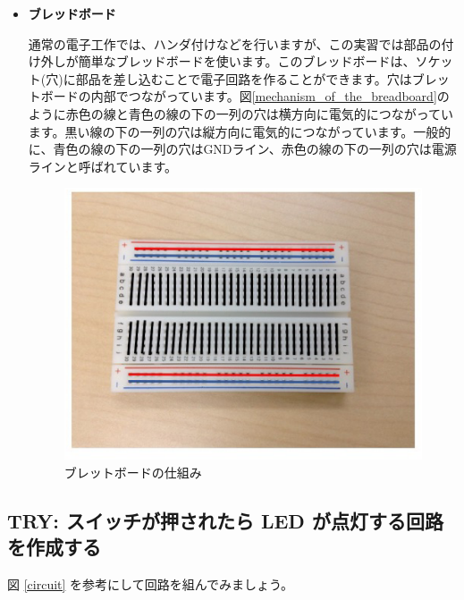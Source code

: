 \documentclass[11pt,a4paper]{jarticle}
\begin{document}
\begin{itemize}
 \item \textbf{ブレッドボード} 
 
通常の電子工作では、ハンダ付けなどを行いますが、この実習では部品の付け外しが簡単なブレッドボードを使います。このブレッドボードは、ソケット(穴)に部品を差し込むことで電子回路を作ることができます。穴はブレットボードの内部でつながっています。図\ref{mechanism_of_the_breadboard}のように赤色の線と青色の線の下の一列の穴は横方向に電気的につながっています。黒い線の下の一列の穴は縦方向に電気的につながっています。一般的に、青色の線の下の一列の穴はGNDライン、赤色の線の下の一列の穴は電源ラインと呼ばれています。

\begin{figure}[htb]
  \centering
  \includegraphics[width=1.0\columnwidth]{mechanism_of_the_breadboard.eps}
  \caption{ブレットボードの仕組み}
  \label{figure:mechanism_of_the_breadboard}
\end{figure}
       
\end{itemize}

\setcounter{nombre}{1}
\subsection*{TRY\thenombre: スイッチが押されたら LED が点灯する回路を作成する}
\label{base}

図 \ref{circuit} を参考にして回路を組んでみましょう。
\end{document}
